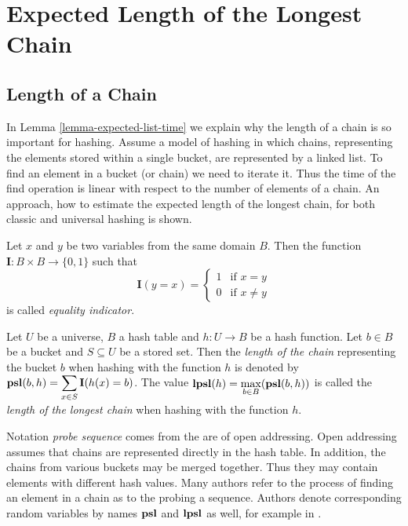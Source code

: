 \chapter{Expected Length of the Longest Chain}
\label{chapter-elpsl}

\section{Length of a Chain}
In Lemma \ref{lemma-expected-list-time} we explain why the length of a chain is so important for hashing. Assume a model of hashing in which chains, representing the elements stored within a single bucket, are represented by a linked list. To find an element in a bucket (or chain) we need to iterate it. Thus the time of the find operation is linear with respect to the number of elements of a chain. An approach, how to estimate the expected length of the longest chain, for both classic and universal hashing is shown.

\begin{definition}
Let $x$ and $y$ be two variables from the same domain $B$. Then the function $\mathbf{I}: B \times B \rightarrow \{0, 1\}$ such that
\[
 \mathbf{I}(y = x) =
  \begin{cases}
   1 & \text{if } x = y \\
   0 & \text{if } x \neq y
  \end{cases}
\]
is called \emph{equality indicator}.
\end{definition}

\begin{definition}
Let $U$ be a universe, $B$ a hash table and $h: U \rightarrow B$ be a hash function. Let $b \in B$ be a bucket and $S \subseteq U$ be a stored set. Then the \emph{length of the chain} representing the bucket $b$ when hashing with the function $h$ is denoted by $\mathbf{psl}(b, h) = \displaystyle \sum_{x \in S} \mathbf{I}(h(x) = b)$. The value $\mathbf{lpsl}(h) = \displaystyle \max_{b \in B} (\mathbf{psl}(b, h))$ is called the \emph{length of the longest chain} when hashing with the function $h$.
\end{definition}

Notation \emph{probe sequence} comes from the are of open addressing. Open addressing assumes that chains are represented directly in the hash table. In addition, the chains from various buckets may be merged together. Thus they may contain elements with different hash values. Many authors refer to the process of finding an element in a chain as to the probing a sequence. Authors denote corresponding random variables by names $\mathbf{psl}$ and $\mathbf{lpsl}$ as well, for example in \cite{10.1109/SFCS.1985.48}.

